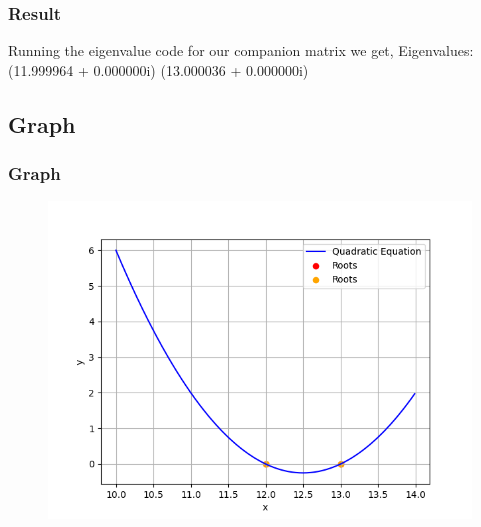 \documentclass{beamer}
\theoremstyle{remark}
\numberwithin{equation}{section}
\begin{document}
      \begin{frame}
        \frametitle{Result}
Running the eigenvalue code for our companion matrix we get,
Eigenvalues:
(11.999964 + 0.000000i) 
(13.000036 + 0.000000i)
      \end{frame}
\subsection{Graph}
      \begin{frame}[fragile]
        \frametitle{Graph}
        \begin{figure}[h!]
          \centering
          \includegraphics[width=1\columnwidth]{figs/fig.png}
          \label{stemplot}
        \end{figure}
      \end{frame}
    
\end{document}
